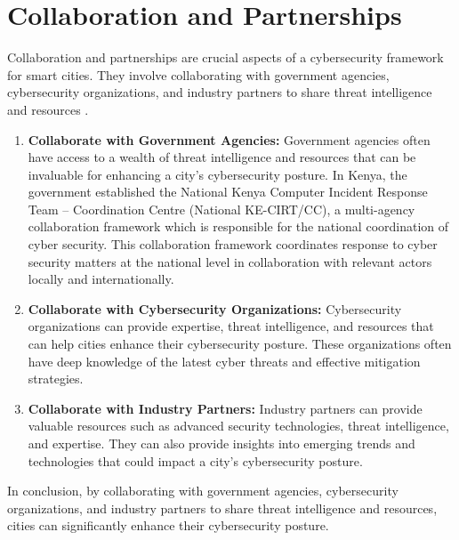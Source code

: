 \documentclass{article}
\begin{document}
\section{Collaboration and Partnerships}
Collaboration and partnerships are crucial aspects of a cybersecurity framework for smart cities. They involve collaborating with government agencies, cybersecurity organizations, and industry partners to share threat intelligence and resources \cite{wall-2022}\cite{bcs-the-chartered-institute-for-it-2021}\cite{cybersecurity-and-infrastructure-security-agency-2021}.
\begin{enumerate}[label=\alph*)]
\item \textbf{Collaborate with Government Agencies:} Government agencies often have access to a wealth of threat intelligence and resources that can be invaluable for enhancing a city’s cybersecurity posture\cite{wall-2022}\cite{bcs-the-chartered-institute-for-it-2021}\cite{cybersecurity-and-infrastructure-security-agency-2021}. In Kenya, the government established the National Kenya Computer Incident Response Team – Coordination Centre (National KE-CIRT/CC), a multi-agency collaboration framework which is responsible for the national coordination of cyber security\cite{national-computer-and-cybercrimes-coordination-committee-no-date}. This collaboration framework coordinates response to cyber security matters at the national level in collaboration with relevant actors locally and internationally\cite{national-computer-and-cybercrimes-coordination-committee-no-date}.
\item \textbf{Collaborate with Cybersecurity Organizations: }Cybersecurity organizations can provide expertise, threat intelligence, and resources that can help cities enhance their cybersecurity posture\cite{wall-2022}\cite{bcs-the-chartered-institute-for-it-2021}\cite{cybersecurity-and-infrastructure-security-agency-2021}. These organizations often have deep knowledge of the latest cyber threats and effective mitigation strategies\cite{wall-2022}\cite{bcs-the-chartered-institute-for-it-2021}\cite{cybersecurity-and-infrastructure-security-agency-2021}.
\item \textbf{Collaborate with Industry Partners:} Industry partners can provide valuable resources such as advanced security technologies, threat intelligence, and expertise\cite{wall-2022}\cite{bcs-the-chartered-institute-for-it-2021}\cite{cybersecurity-and-infrastructure-security-agency-2021}. They can also provide insights into emerging trends and technologies that could impact a city’s cybersecurity posture\cite{wall-2022}\cite{bcs-the-chartered-institute-for-it-2021}\cite{cybersecurity-and-infrastructure-security-agency-2021}.

\end{enumerate}
In conclusion, by collaborating with government agencies, cybersecurity organizations, and industry partners to share threat intelligence and resources, cities can significantly enhance their cybersecurity posture\cite{wall-2022}\cite{bcs-the-chartered-institute-for-it-2021}\cite{cybersecurity-and-infrastructure-security-agency-2021}.
\end{document}
